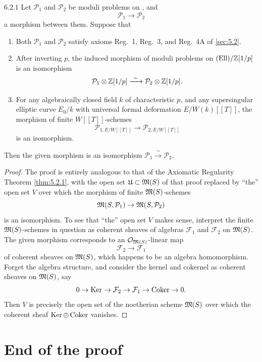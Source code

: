 \begin{ait}{6.2.1}\label{thm:6.2.1}
Let $\mathcal{P}_1$ and $\mathcal{P}_2$ be moduli problems on \Ell, and
\[
\mathcal{P}_1 \to \mathcal{P}_2
\]
a morphism between them. Suppose that
\begin{enumerate}[(1)]
\item Both $\mathcal{P}_1$ and $\mathcal{P}_2$ satisfy axioms Reg.~1, Reg.~3, and Reg.~4A of \ref{sec:5.2}.
\item After inverting $p$, the induced morphism of moduli problems on $(\mathrm{Ell})/\mathbb{Z}[1/p]$ is an isomorphism
\[
\mathcal{P}_1 \otimes \Z[1/p] \xrightarrow{\ \sim\ } \mathcal{P}_2 \otimes \Z[1/p].
\]
\item For any algebraically closed field $k$ of characteristic $p$, and any supersingular elliptic curve $E_0/k$ with universal formal deformation $E/W(k)[[T]]$, the morphism of finite $W[[T]]$-schemes
\[
\mathcal{P}_{1,E/W[[T]]} \to \mathcal{P}_{2,E/W[[T]]}
\]
is an isomorphism.
\end{enumerate}
Then the given morphism is an isomorphism $\mathcal{P}_1 \xrightarrow{\ \sim\ } \mathcal{P}_2$.
\end{ait}

\begin{proof}
The proof is entirely analogous to that of the Axiomatic Regularity Theorem \ref{thm:5.2.1}, with the open set $\mathfrak{U} \subset \mathfrak{M}(S)$ of that proof replaced by ``the'' open set $V$ over which the morphism of finite $\mathfrak{M}(S)$-schemes
\[
\mathfrak{M}(S,\mathcal{P}_1) \to \mathfrak{M}(S,\mathcal{P}_2)
\]
is an isomorphism. To see that ``the'' open set $V$ makes sense, interpret the finite $\mathfrak{M}(S)$-schemes in question as coherent sheaves of algebras $\mathcal{F}_1$ and $\mathcal{F}_2$ on $\mathfrak{M}(S)$. The given morphism corresponds to an $\mathcal{O}_{\mathfrak{M}(S)}$-linear map
\[
\mathcal{F}_2 \to \mathcal{F}_1
\]
of coherent sheaves on $\mathfrak{M}(S)$, which happens to be an algebra homomorphism. Forget the algebra structure, and consider the kernel and cokernel as coherent sheaves on $\mathfrak{M}(S)$, say
\[
0 \to \operatorname{Ker} \to \mathcal{F}_2 \to \mathcal{F}_1 \to \operatorname{Coker} \to 0.
\]
Then $V$ is precisely the open set of the noetherian scheme $\mathfrak{M}(S)$ over which the coherent sheaf $\operatorname{Ker} \oplus \operatorname{Coker}$ vanishes.
\end{proof}

\section{End of the proof}
\label{sec:6.3}


